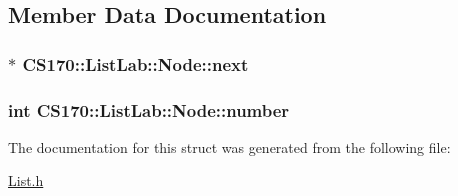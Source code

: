 \subsection{Member Data Documentation}
\hypertarget{struct_c_s170_1_1_list_lab_1_1_node_a696b86640701eb95456b6a23b1e61464}{
\subsubsection[{next}]{$\ast$ {\bf C\-S170\-::\-List\-Lab\-::\-Node\-::next}}}\label{struct_c_s170_1_1_list_lab_1_1_node_a696b86640701eb95456b6a23b1e61464}
\hypertarget{struct_c_s170_1_1_list_lab_1_1_node_a47d68bf6dcda11fb33cbae1e11ad82a0}{
\subsubsection[{number}]{\setlength{\rightskip}{0pt plus 5cm}int {\bf C\-S170\-::\-List\-Lab\-::\-Node\-::number}}}\label{struct_c_s170_1_1_list_lab_1_1_node_a47d68bf6dcda11fb33cbae1e11ad82a0}


The documentation for this struct was generated from the following file\-:\begin{DoxyCompactItemize}
\item 
\hyperlink{_list_8h}{List.\-h}\end{DoxyCompactItemize}
